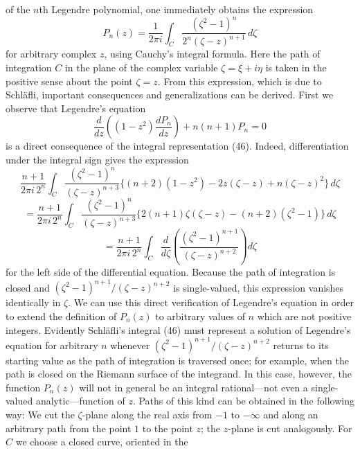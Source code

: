 of the $n$th Legendre polynomial, one immediately obtains the expression
\begin{equation}\tag{46}
P_n(z)=\frac1{2\pi i}\int_C\frac{(\zeta^2-1)^n}{2^n(\zeta-z)^{n+1}}\,d\zeta
\end{equation}
for arbitrary complex $z$, using Cauchy's integral formula. Here the path of integration $C$ in the plane of the complex variable $\zeta=\xi+i\eta$ is taken in the positive sense about the point $\zeta=z$. From this expression, which is due to Schl\"afli, important consequences and generalizations can be derived. First we observe that Legendre's equation
\[
\frac d{dz}\left((1-z^2)\frac{dP_n}{dz}\right)+n(n+1)P_n=0
\]
is a direct consequence of the integral representation (46). Indeed, differentiation under the integral sign gives the expression
\[
\frac{n+1}{2\pi i\,2^n}\int_C\frac{(\zeta^2-1)^n}{(\zeta-z)^{n+3}}
\{(n+2)(1-z^2)-2z(\zeta-z)+n(\zeta-z)^2\}\,d\zeta
\]
\[
=\frac{n+1}{2\pi i\,2^n}\int_C\frac{(\zeta^2-1)^n}{(\zeta-z)^{n+3}}
\{2(n+1)\zeta(\zeta-z)-(n+2)(\zeta^2-1)\}\,d\zeta
\]
\[
=\frac{n+1}{2\pi i\,2^n}\int_C\frac d{d\zeta}
\left(\frac{(\zeta^2-1)^{n+1}}{(\zeta-z)^{n+2}}\right)d\zeta
\]
for the left side of the differential equation. Because the path of integration is closed and $(\zeta^2-1)^{n+1}/(\zeta-z)^{n+2}$ is single-valued, this expression vanishes identically in $\zeta$. We can use this direct verification of Legendre's equation in order to extend the definition of $P_n(z)$ to arbitrary values of $n$ which are not positive integers. Evidently Schl\"afli's integral (46) must represent a solution of Legendre's equation for arbitrary $n$ whenever $(\zeta^2-1)^{n+1}/(\zeta-z)^{n+2}$ returns to its starting value as the path of integration is traversed once; for example, when the path is closed on the Riemann surface of the integrand. In this case, however, the function $P_n(z)$ will not in general be an integral rational---not even a single-valued analytic---function of $z$. Paths of this kind can be obtained in the following way: We cut the $\zeta$-plane along the real axis from $-1$ to $-\infty$ and along an arbitrary path from the point $1$ to the point $z$; the $z$-plane is cut analogously. For $C$ we choose a closed curve, oriented in the

